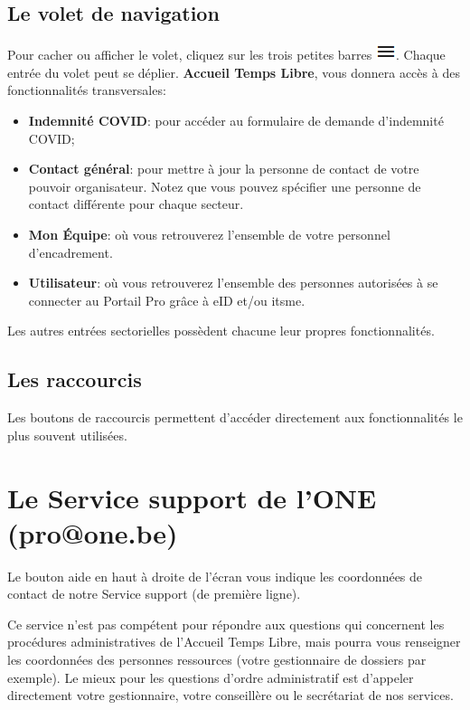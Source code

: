 \subsection{Le volet de navigation}
Pour cacher ou afficher le volet, cliquez sur les trois petites barres \includegraphics{Images/intro/button_volet.png}. Chaque entrée du volet peut se déplier. \textbf{Accueil Temps Libre}, vous donnera accès à des fonctionnalités transversales: \begin{itemize}
    \item \textbf{Indemnité COVID}: pour accéder au formulaire de demande d'indemnité COVID;
    \item \textbf{Contact général}: pour mettre à jour la personne de contact de votre pouvoir organisateur. Notez que vous pouvez spécifier une personne de contact différente pour chaque secteur. 
    \item \textbf{Mon Équipe}: où vous retrouverez l'ensemble de votre personnel d'encadrement. 
    \item \textbf{Utilisateur}: où vous retrouverez l'ensemble des personnes autorisées à se connecter au Portail Pro grâce à eID et/ou itsme.
\end{itemize}
Les autres entrées sectorielles possèdent chacune leur propres fonctionnalités.

\subsection{Les raccourcis}
Les boutons de raccourcis permettent d’accéder directement aux fonctionnalités le plus souvent utilisées.  

\section{Le Service support de l'ONE (pro@one.be)}
Le bouton aide en haut à droite de l'écran vous indique les coordonnées de contact de notre Service support (de première ligne). 

\begin{remarque} \label{helpdesk}
Ce service n'est pas compétent pour répondre aux questions qui concernent les procédures administratives de l'Accueil Temps Libre, mais pourra vous renseigner les coordonnées des personnes ressources (votre gestionnaire de dossiers par exemple). Le mieux pour les questions d’ordre administratif est d’appeler directement votre gestionnaire, votre conseillère ou le secrétariat de nos services.
\end{remarque}

